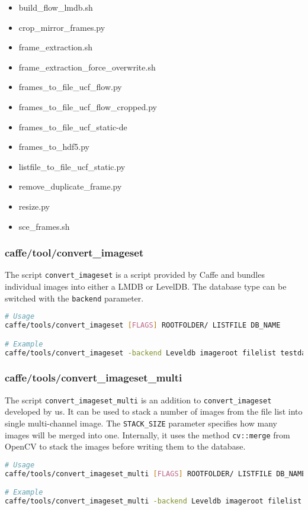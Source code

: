\begin{itemize}
\item build\_flow\_lmdb.sh
\item crop\_mirror\_frames.py
\item frame\_extraction.sh
\item frame\_extraction\_force\_overwrite.sh
\item frames\_to\_file\_ucf\_flow.py
\item frames\_to\_file\_ucf\_flow\_cropped.py
\item frames\_to\_file\_ucf\_static-de
\item frames\_to\_hdf5.py
\item listfile\_to\_file\_ucf\_static.py
\item remove\_duplicate\_frame.py
\item resize.py
\item sce\_frames.sh
\end{itemize}

\subsubsection{caffe/tool/convert\_imageset}
The script \texttt{convert\_imageset} is a script provided by Caffe and bundles individual images into either a LMDB or LevelDB.
The database type can be switched with the \texttt{backend} parameter.

\begin{lstlisting}[language=sh, caption=convert\_image.sh, label=lst:convert_imageset]
# Usage
caffe/tools/convert_imageset [FLAGS] ROOTFOLDER/ LISTFILE DB_NAME

# Example
caffe/tools/convert_imageset -backend Leveldb imageroot filelist testdatabase.leveldb
\end{lstlisting}

\subsubsection{caffe/tools/convert\_imageset\_multi}
The script \texttt{convert\_imageset\_multi} is an addition to  \texttt{convert\_imageset} developed by us. It can be used to stack a number of images from the file list into single multi-channel image.
The \texttt{STACK\_SIZE} parameter specifies how many images will be merged into one.
Internally, it uses the method \texttt{cv::merge} from OpenCV to stack the images before writing them to the database.
\begin{lstlisting}[language=sh, caption=convert\_image\_multi.sh, label=lst:convert_imageset]
# Usage
caffe/tools/convert_imageset_multi [FLAGS] ROOTFOLDER/ LISTFILE DB_NAME STACK_SIZE

# Example
caffe/tools/convert_imageset_multi -backend Leveldb imageroot filelist testdatabase.leveldb 16 
\end{lstlisting}

